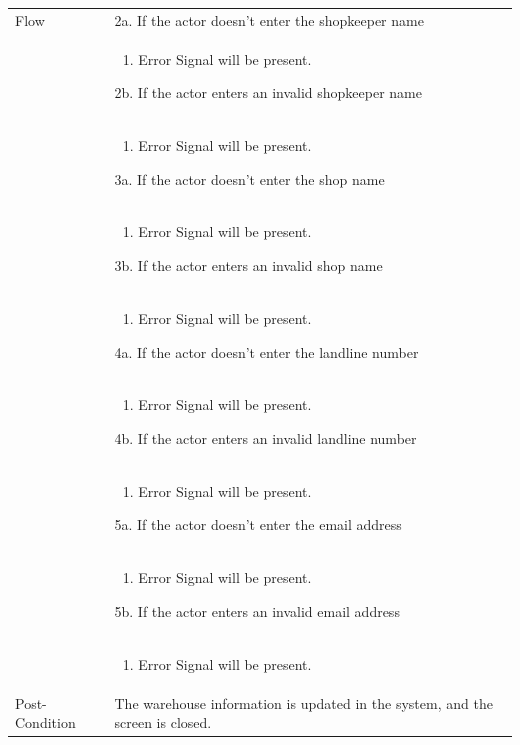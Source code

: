 \documentclass[12pt,a4paper]{report}
\begin{document}
\begin{tabular}{ | m{3cm} | m{12cm}| } \hline
Flow & 
2a. If the actor doesn't enter the shopkeeper name \\ 	
&	\begin{enumerate}
		\item Error Signal will be present.
	\end{enumerate}
2b. If the actor enters an invalid shopkeeper name \\ 	
&	\begin{enumerate}
		\item Error Signal will be present.
	\end{enumerate}
3a. If the actor doesn't enter the shop name \\ 	
&	\begin{enumerate}
		\item Error Signal will be present.
	\end{enumerate}
3b. If the actor enters an invalid shop name \\ 	
&	\begin{enumerate}
		\item Error Signal will be present.
	\end{enumerate}
4a. If the actor doesn't enter the landline number \\ 	
&	\begin{enumerate}
		\item Error Signal will be present.
	\end{enumerate}
4b. If the actor enters an invalid landline number\\ 	
&	\begin{enumerate}
		\item Error Signal will be present.
	\end{enumerate}
5a. If the actor doesn't enter the email address \\ 	
&	\begin{enumerate}
		\item Error Signal will be present.
	\end{enumerate}
5b. If the actor enters an invalid email address\\ 	
&	\begin{enumerate}
		\item Error Signal will be present.
	\end{enumerate}
\\ \hline
Post-Condition & The warehouse information is updated in the system, and the screen is closed.  \\\hline
\end{tabular}
\end{document}

